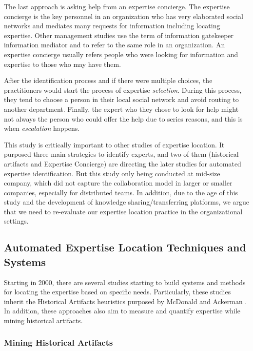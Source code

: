 The last approach is asking help from an expertise concierge. The expertise concierge is the key personnel in an organization who has very elaborated social networks and mediates many requests for information including locating expertise. Other management studies use the term of information gatekeeper \cite{allen1977managing} information mediator \cite{ehrlich1994turning} and \cite{paepcke1996information} to refer to the same role in an organization. An expertise concierge usually refers people who were looking for information and expertise to those who may have them.

After the identification process and if there were multiple choices, the practitioners would start the process of expertise \textit{selection}. During this process, they tend to choose a person in their local social network and avoid routing to another department. Finally, the expert who they chose to look for help might not always the person who could offer the help due to series reasons, and this is when \textit{escalation} happens.

This study is critically important to other studies of expertise location. It purposed three main strategies to identify experts, and two of them (historical artifacts and Expertise Concierge) are directing the later studies for automated expertise identification. But this study only being conducted at mid-size company, which did not capture the collaboration model in larger or smaller companies, especially for distributed teams. In addition, due to the age of this study and the development of knowledge sharing/transferring platforms, we argue that we need to re-evaluate our expertise location practice in the organizational settings. 

\subsection{Automated Expertise Location Techniques and Systems}

Starting in 2000, there are several studies starting to build systems and methods for locating the expertise based on specific needs. Particularly, these studies inherit the Historical Artifacts heuristics purposed by McDonald and Ackerman \cite{mcdonald1998just}. In addition, these approaches also aim to measure and quantify expertise while mining historical artifacts.

\subsubsection{Mining Historical Artifacts}

